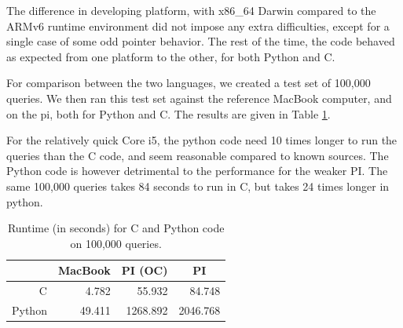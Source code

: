 The difference in developing platform, with x86\_64 Darwin compared to the ARMv6 runtime environment did not impose any extra difficulties, except for a single case of some odd pointer behavior.
The rest of the time, the code behaved as expected from one platform to the other, for both Python and C.

For comparison between the two languages, we created a test set of 100,000 queries. We then ran this test set against the reference MacBook computer, and on the pi, both for Python and {C}.
The results are given in Table \ref{tbl:runtimes_ports}.

For the relatively quick {Core i5}, the python code need 10 times longer to run the queries than the C code, and seem reasonable compared to known sources.
The Python code is however detrimental to the performance for the weaker PI. The same 100,000 queries takes 84 seconds to run in C, but takes 24 times longer in python.

\begin{table}[h]
	\begin{center}
	\begin{tabular}{|r|r|r|r|}
	\hline
	   & \multicolumn{1}{|c|}{MacBook} & \multicolumn{1}{|c|}{PI (OC)}  & \multicolumn{1}{|c|}{PI} \\
	\hline
	C      & 4.782 & 55.932 & 84.748     \\
	\hline
	Python & 49.411 & 1268.892 & 2046.768   \\
	\hline
	\end{tabular}
	\caption{Runtime (in seconds) for C and Python code on 100,000 queries.}
	\label{tbl:runtimes_ports}
	\end{center}
\end{table}

